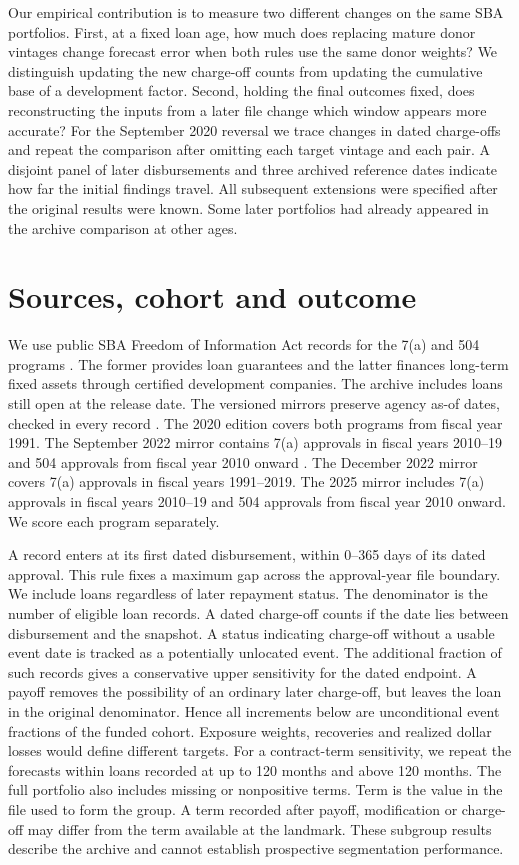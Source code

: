 \documentclass[11pt]{article}
\newcommand{\sba}{7(a)}
\begin{document}
Our empirical contribution is to measure two different changes on the same SBA portfolios. First, at a fixed loan age, how much does replacing mature donor vintages change forecast error when both rules use the same donor weights? We distinguish updating the new charge-off counts from updating the cumulative base of a development factor. Second, holding the final outcomes fixed, does reconstructing the inputs from a later file change which window appears more accurate? For the September 2020 reversal we trace changes in dated charge-offs and repeat the comparison after omitting each target vintage and each pair. A disjoint panel of later disbursements and three archived reference dates indicate how far the initial findings travel. All subsequent extensions were specified after the original results were known. Some later portfolios had already appeared in the archive comparison at other ages.

\section{Sources, cohort and outcome}
We use public SBA Freedom of Information Act records for the \sba{} and 504 programs \cite{sba}. The former provides loan guarantees and the latter finances long-term fixed assets through certified development companies. The archive includes loans still open at the release date. The versioned mirrors preserve agency as-of dates, checked in every record \cite{editions}. The 2020 edition covers both programs from fiscal year 1991. The September 2022 mirror contains \sba{} approvals in fiscal years 2010--19 and 504 approvals from fiscal year 2010 onward \cite{september}. The December 2022 mirror covers \sba{} approvals in fiscal years 1991--2019. The 2025 mirror includes \sba{} approvals in fiscal years 2010--19 and 504 approvals from fiscal year 2010 onward. We score each program separately.

A record enters at its first dated disbursement, within 0--365 days of its dated approval. This rule fixes a maximum gap across the approval-year file boundary. We include loans regardless of later repayment status. The denominator is the number of eligible loan records. A dated charge-off counts if the date lies between disbursement and the snapshot. A status indicating charge-off without a usable event date is tracked as a potentially unlocated event. The additional fraction of such records gives a conservative upper sensitivity for the dated endpoint. A payoff removes the possibility of an ordinary later charge-off, but leaves the loan in the original denominator. Hence all increments below are unconditional event fractions of the funded cohort. Exposure weights, recoveries and realized dollar losses would define different targets. For a contract-term sensitivity, we repeat the forecasts within loans recorded at up to 120 months and above 120 months. The full portfolio also includes missing or nonpositive terms. Term is the value in the file used to form the group. A term recorded after payoff, modification or charge-off may differ from the term available at the landmark. These subgroup results describe the archive and cannot establish prospective segmentation performance.
\end{document}
